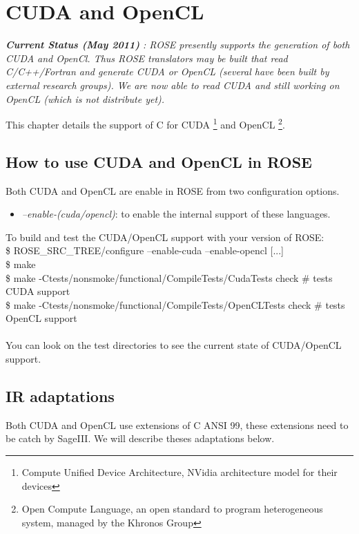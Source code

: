 \chapter{CUDA and OpenCL}

\label{heterogeneous:heterogeneous}

{\em {\bf Current Status (May 2011) }: ROSE presently supports the generation of both CUDA and OpenCl.
    Thus ROSE translators may be built that read C/C++/Fortran and generate
    CUDA or OpenCL (several have been built by external research groups).
    We are now able to read CUDA and still working on OpenCL (which is not distribute yet).}
\vspace{0.25in}

This chapter details the support of C for CUDA \footnote{Compute Unified Device Architecture, NVidia architecture model for their devices} and OpenCL \footnote{Open Compute Language,
an open standard to program heterogeneous system, managed by the Khronos Group}.

	\section{How to use CUDA and OpenCL in ROSE}
	
	Both CUDA and OpenCL are enable in ROSE from two configuration options.
\begin{itemize}
	\item \emph{--enable-(cuda/opencl)}: to enable the internal support of these languages.
\end{itemize}
	To build and test the CUDA/OpenCL support with your version of ROSE: \\
	\$ ROSE\_SRC\_TREE/configure --enable-cuda --enable-opencl [...] \\
	\$ make \\
	\$ make -Ctests/nonsmoke/functional/CompileTests/CudaTests check \# tests CUDA support \\
	\$ make -Ctests/nonsmoke/functional/CompileTests/OpenCLTests check \# tests OpenCL support \\
	\\
	You can look on the test directories to see the current state of CUDA/OpenCL support.
	
	\section{IR adaptations}
	
		Both CUDA and OpenCL use extensions of C ANSI 99, these extensions need to be catch by SageIII. We will describe theses adaptations below.

